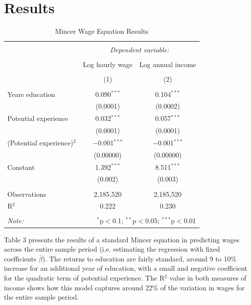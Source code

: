 \documentclass[notitlepage,12pt]{article}
\begin{document}
\section{Results}

\begin{table}[H]
\singlespace
\centering
\caption{Mincer Wage Equation Results}
\begin{tabular}{@{\extracolsep{5pt}}lcc} 
\\[-1.8ex]\hline 
\hline \\[-1.8ex] 
 & \multicolumn{2}{c}{\textit{Dependent variable:}} \\ 
\cline{2-3} 
\\[-1.8ex] & Log hourly wage & Log annual income \\ 
\\[-1.8ex] & (1) & (2)\\ 
\hline \\[-1.8ex] 
 Years education & 0.090$^{***}$ & 0.104$^{***}$ \\ 
  & (0.0001) & (0.0002) \\ 
  Potential experience & 0.032$^{***}$ & 0.057$^{***}$ \\ 
  & (0.0001) & (0.0001) \\ 
  (Potential experience)$^2$ & $-$0.001$^{***}$ & $-$0.001$^{***}$ \\ 
  & (0.00000) & (0.00000) \\ 
  Constant & 1.392$^{***}$ & 8.511$^{***}$ \\ 
  & (0.002) & (0.003) \\ 
 \hline \\[-1.8ex] 
Observations & 2,185,520 & 2,185,520 \\ 
R$^{2}$ & 0.222 & 0.230 \\
\hline 
\hline \\[-1.8ex] 
\textit{Note:}  & \multicolumn{2}{r}{$^{*}$p$<$0.1; $^{**}$p$<$0.05; $^{***}$p$<$0.01} \\ 
\end{tabular} 
\end{table}

Table 3 presents the results of a standard Mincer equation in predicting wages across the entire sample period (i.e. estimating the regression with fixed coefficients $\bar{\beta}$).  The returns to education are fairly standard, around 9 to 10\% increase for an additional year of education, with a small and negative coefficient for the quadratic term of potential experience.  The R$^2$ value in both measures of income shows how this model captures around 22\% of the variation in wages for the entire sample period.
\end{document}
